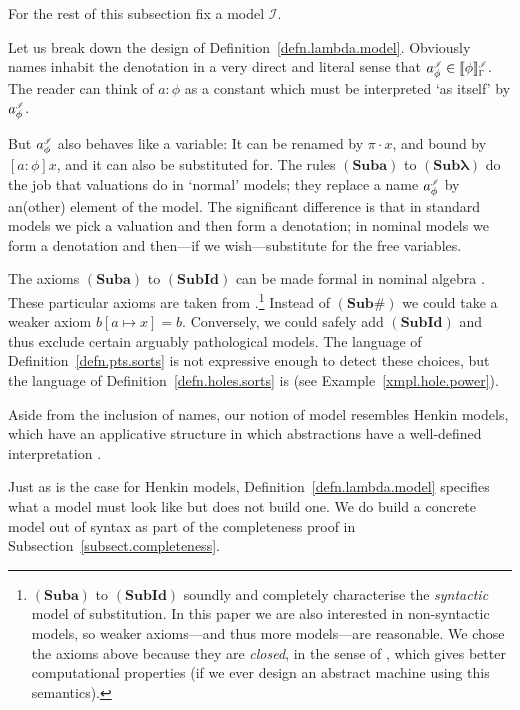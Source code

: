 \documentclass[submission,copyright]{eptcs}
\newcommand{\rulefont}[1]{\ensuremath{(\mathbf{#1})}}
\newcommand{\sm}{\mapsto}
\newcommand\den[1]{{\hspace{.00ex}\scalebox{.55}{$#1$}}}
\newcommand{\idenot}[2]{\denot{\interp I}{#1}{#2}}
\newcommand\interp[1]{\ensuremath{\mathscr #1}}
\newcommand{\denot}[3]{\llbracket #3 \rrbracket_{\scalebox{.6}{$#2$}}^\den{#1}} \newcommand{\hdenot}[1]{\denot{\interp H}{}{#1}}
\newcommand{\act}{{\cdot}}
\begin{document}
For the rest of this subsection fix a model $\interp I$. 

Let us break down the design of Definition~\ref{defn.lambda.model}.
Obviously names inhabit the denotation in a very direct and literal sense that $a^\iden_\phi\in\idenot{\Gamma}{\phi}$.
The reader can think of $a:\phi$ as a constant which must be interpreted `as itself' by $a^\iden_\phi$.

But $a^\iden_\phi$ also behaves like a variable:
It can be renamed by $\pi\act x$, and bound by $[a{:}\phi]x$, and it can also be substituted for.
The rules \rulefont{Suba} to \rulefont{Sub\text{$\lambda$}} do the job that valuations do in `normal' models; they replace a name $a^\iden_\phi$ by an(other) element of the model.
The significant difference is that in standard models we pick a valuation and then form a denotation; in nominal models we form a denotation and then---if we wish---substitute for the free variables.

The axioms \rulefont{Suba} to \rulefont{SubId} can be made formal in nominal algebra \cite{gabbay:nomuae}.
These particular axioms are taken from \cite{gabbay:capasn-jv}.\footnote{\rulefont{Suba} to \rulefont{SubId} soundly and completely characterise the \emph{syntactic} model of substitution.
In this paper we are also interested in non-syntactic models, so weaker axioms---and thus more models---are reasonable.  
We chose the axioms above because they are \emph{closed}, in the sense of \cite{gabbay:nomr-jv,gabbay:clonre}, which gives better computational properties (if we ever design an abstract machine using this semantics).
}
Instead of \rulefont{Sub\#} we could take a weaker axiom $b[a{\sm} x]=b$.
Conversely, we could safely add \rulefont{SubId} and thus exclude certain arguably pathological models.
The language of Definition~\ref{defn.pts.sorts} is not expressive enough to detect these choices, but the language of Definition~\ref{defn.holes.sorts} is (see Example~\ref{xmpl.hole.power}).



Aside from the inclusion of names, our notion of model resembles Henkin models, which have an applicative structure in which abstractions have a well-defined interpretation \cite{henkin:comtot}.


Just as is the case for Henkin models, Definition~\ref{defn.lambda.model} specifies what a model must look like but does not build one.
We do build a concrete model out of syntax as part of the completeness proof in Subsection~\ref{subsect.completeness}. 
 
\end{document}
